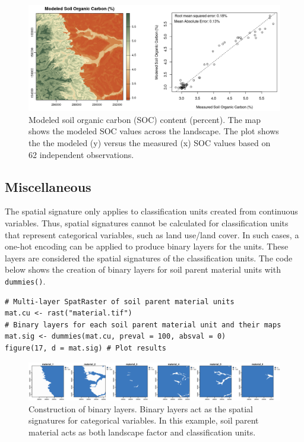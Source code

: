 \begin{figure}[H]

{\centering \includegraphics[width=1\linewidth,height=0.23\textheight]{figures/figure_16} 

}

\caption{Modeled soil organic carbon (SOC) content (percent). The map shows the modeled SOC values across the landscape. The plot shows the the modeled (y) versus the measured (x) SOC values based on 62 independent observations.}\label{fig:f17}
\end{figure}

\hypertarget{miscellaneous}{%
\subsection{Miscellaneous}\label{miscellaneous}}

The spatial signature only applies to classification units created from
continuous variables. Thus, spatial signatures cannot be calculated for
classification units that represent categorical variables, such as land use/land
cover. In such cases, a one-hot encoding can be applied to produce binary layers
for the units. These layers are considered the spatial signatures of the
classification units. The code below shows the creation of binary layers for
soil parent material units with \texttt{dummies()}.

\begin{verbatim}
# Multi-layer SpatRaster of soil parent material units
mat.cu <- rast("material.tif")
# Binary layers for each soil parent material unit and their maps
mat.sig <- dummies(mat.cu, preval = 100, absval = 0)
figure(17, d = mat.sig) # Plot results
\end{verbatim}

\begin{figure}[H]

{\centering \includegraphics[width=1\linewidth,height=0.1\textheight]{figures/figure_17} 

}

\caption{Construction of binary layers. Binary layers act as the spatial signatures for categorical variables. In this example, soil parent material acts as both landscape factor and classification units.}\label{fig:f18}
\end{figure}

